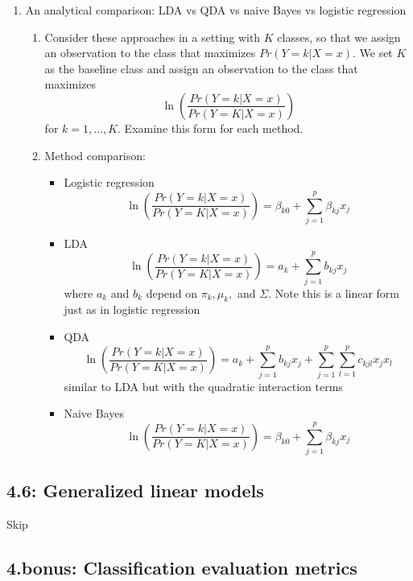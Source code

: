 \documentclass{article}
\begin{document}
\begin{enumerate}
\item An analytical comparison: LDA vs QDA vs naive Bayes vs logistic regression
\begin{enumerate}
\item Consider these approaches in a setting with $K$ classes, so that we assign an observation to the class that maximizes $Pr(Y=k | X=x)$. We set $K$ as the baseline class and assign an observation to the class that maximizes
\[
\ln \left( \frac{Pr(Y=k | X=x)}{Pr(Y=K | X=x)} \right)
\]
for $k = 1, \dots, K$. Examine this form for each method.
\item Method comparison:
\begin{itemize}
\item Logistic regression
\[
\ln \left( \frac{Pr(Y=k | X=x)}{Pr(Y=K | X=x)} \right) = \beta_{k0} + \sum_{j=1}^p \beta_{kj} x_j
\]
\item LDA
\[
\ln \left( \frac{Pr(Y=k | X=x)}{Pr(Y=K | X=x)} \right) = a_k + \sum_{j=1}^p b_{kj}x_j
\]
where $a_k$ and $b_k$ depend on $\pi_k, \mu_k, $ and $\Sigma$. Note this is a linear form just as in logistic regression
\item QDA
\[
\ln \left( \frac{Pr(Y=k | X=x)}{Pr(Y=K | X=x)} \right) =  a_k + \sum_{j=1}^p b_{kj}x_j + \sum_{j=1}^p\sum_{l=1}^p c_{kjl}x_jx_l 
\]
similar to LDA but with the quadratic interaction terms
\item Naive Bayes
\[
\ln \left( \frac{Pr(Y=k | X=x)}{Pr(Y=K | X=x)} \right) = \beta_{k0} + \sum_{j=1}^p \beta_{kj} x_j
\]
\end{itemize}
\end{enumerate}

\end{enumerate}

\subsection*{4.6: Generalized linear models}
Skip

\subsection*{4.bonus: Classification evaluation metrics}
\end{document}

